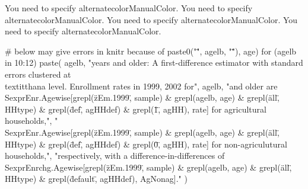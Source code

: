 \begin{Schunk}
\begin{Soutput}
You need to specify alternatecolorManualColor.
You need to specify alternatecolorManualColor.
You need to specify alternatecolorManualColor.
You need to specify alternatecolorManualColor.
\end{Soutput}
\end{Schunk}


\begin{Schunk}
\begin{Sinput}
# below may give errors in knitr because of paste0("\"", agelb, "\""), age)
for (agelb in 10:12) 
paste(
agelb,  
"years and older: A first-difference estimator with standard errors clustered at \\textit{thana} level. Enrollment rates in 1999, 2002 for", 
agelb, 
"and older are \\Sexpr{Enr.Agewise[grepl(\"zEm.1999\", sample) & grepl(agelb, age)  & grepl(\"all\", HHtype) & grepl(\"def\", agHHdef) & grepl(\"1\", agHH), rate]} for agricultural households,",
"\\Sexpr{Enr.Agewise[grepl(\"zEm.1999\", sample) & grepl(agelb, age) & grepl(\"all\", HHtype) & grepl(\"def\", agHHdef) & grepl(\"0\", agHH), rate]} for non-agriculutural households,", 
"respectively, with a difference-in-differences of \\Sexpr{Enrchg.Agewise[grepl(\"zEm.1999\", sample) & grepl(agelb, age) & grepl(\"all\", HHtype) & grepl(\"default\", agHHdef), AgNonag]}."
)
\end{Sinput}
\end{Schunk}


